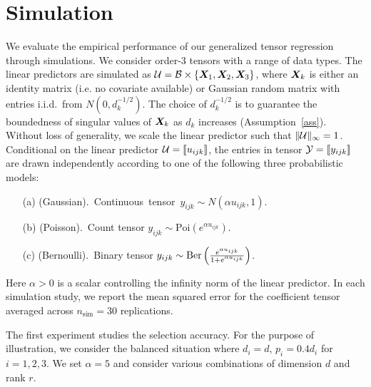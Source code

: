 \documentclass[11pt]{article}
\theoremstyle{plain}
\theoremstyle{definition}
\begin{document}
{\section{Simulation}\label{sec:simulation}
We evaluate the empirical performance of our generalized tensor regression through simulations. We consider order-3 tensors with a range of data types. The linear predictors are simulated as $\mathcal{U}=\mathcal{B}\times\{\bm X_1,\bm X_2,\bm X_3\}$, where $\bm X_k$ is either an identity matrix (i.e. no covariate available) or Gaussian random matrix with entries i.i.d.\ from $N(0,d_k^{-1/2})$. The choice of $d_k^{-1/2}$ is to guarantee the boundedness of singular values of $\bm X_k$ as $d_k$ increases (Assumption~\ref{ass}). Without loss of generality, we scale the linear predictor such that $\lVert\mathcal{U}\rVert_\infty=1$. Conditional on the linear predictor $\mathcal{U}=\llbracket u_{ijk} \rrbracket$, the entries in tensor $\mathcal{Y}=\llbracket y_{ijk} \rrbracket$ are drawn independently according to one of the following three probabilistic models:
\begin{enumerate}[itemsep=0pt,topsep=0pt]
\item[(a)] (Gaussian).~Continuous~tensor~$y_{ijk}\sim N\left(\alpha u_{ijk}, 1\right)$.
\item[(b)] (Poisson).~Count tensor $y_{ijk}\sim\text{Poi}\left( e^{\alpha u_{ijk}}\right)$.
\item[(c)] (Bernoulli).~Binary tensor $y_{ijk}\sim \text{Ber}\left( {e^{\alpha u_{ijk}} \over 1+e^{\alpha u_{ijk}}}\right)$.
\end{enumerate}
Here $\alpha>0$ is a scalar controlling the infinity norm of the linear predictor. In each simulation study, we report the mean squared error for the coefficient tensor averaged across $n_{\text{sim}}=30$ replications. 

The first experiment studies the selection accuracy. For the purpose of illustration, we consider the balanced situation where $d_i=d$, $p_i=0.4d_i$ for $i=1,2,3$. We set $\alpha=5$ and consider various combinations of dimension $d$ and rank $r$.
\begin{table}[H]
\end{table}

}
\end{document}
